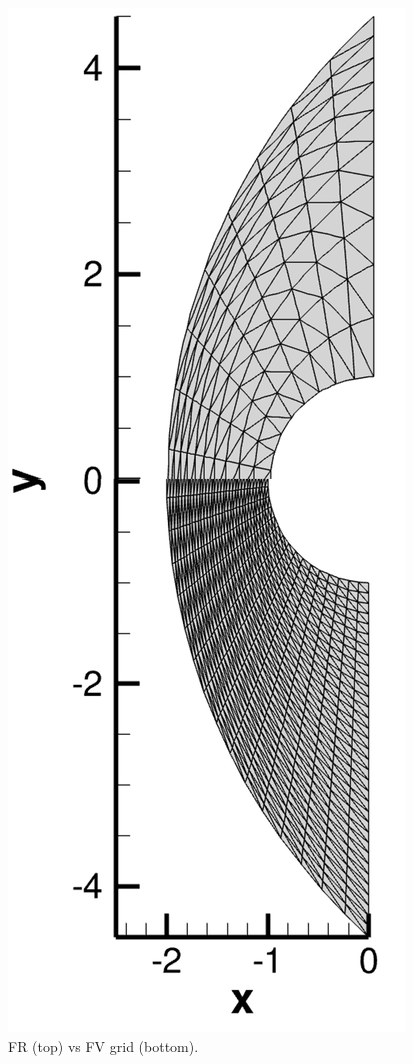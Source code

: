 \documentclass[11pt,sans]{wlscirep} %
\begin{document}
\par
\begin{figure}
  \vspace{-10pt}
     \includegraphics[trim={1cm 0.8cm 1cm 0cm},clip,scale=0.6]{figures/HO_vs_FVM.png} 
  \caption{FR (top) vs FV grid (bottom).}  \vspace{-11pt}
 \label{fig:grid}
\end{figure} \vspace{-3pt} %
\end{document}

